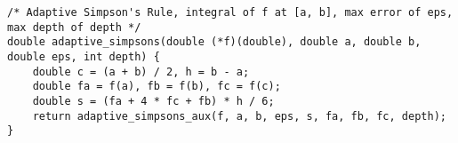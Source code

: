 \begin{verbatim}
/* Adaptive Simpson's Rule, integral of f at [a, b], max error of eps, max depth of depth */
double adaptive_simpsons(double (*f)(double), double a, double b, double eps, int depth) {
    double c = (a + b) / 2, h = b - a;
    double fa = f(a), fb = f(b), fc = f(c);
    double s = (fa + 4 * fc + fb) * h / 6;
    return adaptive_simpsons_aux(f, a, b, eps, s, fa, fb, fc, depth);
}
\end{verbatim}
